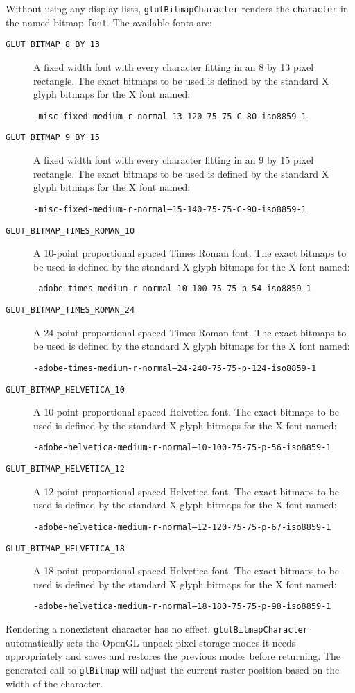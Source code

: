 Without using any display lists, {\tt glutBitmapCharacter} renders the {\tt character}
in the named bitmap {\tt font}.  The available fonts are:
\begin{description}
\item[{{\tt GLUT\_BITMAP\_8\_BY\_13}}]
A fixed width font with every character fitting in an 8 by 13 pixel
rectangle.  The exact bitmaps to be used is defined by the standard X glyph
bitmaps for the X font named:

{\tt -misc-fixed-medium-r-normal--13-120-75-75-C-80-iso8859-1}

\item[{{\tt GLUT\_BITMAP\_9\_BY\_15}}]
A fixed width font with every character fitting in an 9 by 15 pixel
rectangle.  The exact bitmaps to be used is defined by the standard X glyph
bitmaps for the X font named:

{\tt -misc-fixed-medium-r-normal--15-140-75-75-C-90-iso8859-1}

\item[{{\tt GLUT\_BITMAP\_TIMES\_ROMAN\_10}}]
A 10-point proportional spaced
Times Roman font.  The exact bitmaps to be used is defined by the
standard X glyph bitmaps for the X font named:

{\tt -adobe-times-medium-r-normal--10-100-75-75-p-54-iso8859-1}

\item[{{\tt GLUT\_BITMAP\_TIMES\_ROMAN\_24}}]
A 24-point proportional spaced
Times Roman font.  The exact bitmaps to be used is defined by the
standard X glyph bitmaps for the X font named:

{\tt -adobe-times-medium-r-normal--24-240-75-75-p-124-iso8859-1}

\item[{{\tt GLUT\_BITMAP\_HELVETICA\_10}}]
A 10-point proportional spaced
Helvetica font.  The exact bitmaps to be used is defined by the
standard X glyph bitmaps for the X font named:

{\tt -adobe-helvetica-medium-r-normal--10-100-75-75-p-56-iso8859-1}

\item[{{\tt GLUT\_BITMAP\_HELVETICA\_12}}]
A 12-point proportional spaced
Helvetica font.  The exact bitmaps to be used is defined by the
standard X glyph bitmaps for the X font named:

{\tt -adobe-helvetica-medium-r-normal--12-120-75-75-p-67-iso8859-1}

\item[{{\tt GLUT\_BITMAP\_HELVETICA\_18}}]
A 18-point proportional spaced
Helvetica font.  The exact bitmaps to be used is defined by the
standard X glyph bitmaps for the X font named:

{\tt -adobe-helvetica-medium-r-normal--18-180-75-75-p-98-iso8859-1}

\end{description}
Rendering a nonexistent character has no effect.  {\tt glutBitmapCharacter} automatically
sets the OpenGL unpack pixel storage modes it needs appropriately and saves and restores
the previous modes before returning.  The generated call to {\tt glBitmap} will
adjust the current raster position based on the width of the character.

